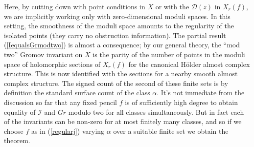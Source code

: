 \documentclass[10pt]{article}
\begin{document}
\noindent Here, by cutting down with point conditions in $X$ or with
the $\mathcal{D}(z)$ in $X_r(f)$, we are implicitly working only with
zero-dimensional 
moduli spaces.  In this setting, the smoothness of the moduli space
amounts to the regularity of the
isolated points (they carry no obstruction information).  The partial
result (\ref{IequalsGrmodtwo}) is almost a 
consequence; by our general theory, the ``mod two'' Gromov invariant
on $X$ is the  parity of the number of
points in the moduli space of holomorphic sections of $X_r(f)$ for
the canonical H\"older almost complex structure.  This is now identified
with the sections for a nearby smooth almost complex structure.
The signed count of the second of these finite sets is by
definition the standard surface count of the class $\alpha$.  It's not
immediate from the discussion so far
that any fixed pencil $f$ is of sufficiently high degree to obtain
equality of $\mathcal{I}$ and $Gr$ modulo two for all classes
simultaneously.  But in fact each of the invariants can be non-zero for at
most finitely many classes, and
so if we choose $f$ as in (\ref{regularj}) varying $\alpha$ over
a suitable finite set we obtain the theorem.
\end{document}
